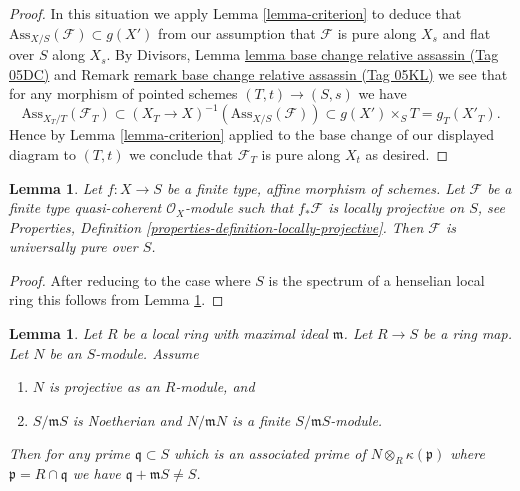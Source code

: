 \documentclass{amsart}
\theoremstyle{plain}
\newtheorem{lemma}[subsection]{Lemma}
\theoremstyle{definition}
\theoremstyle{remark}
\numberwithin{equation}{subsection}
\begin{document}
\begin{proof}
\medskip\noindent
In this situation we apply
Lemma \ref{lemma-criterion}
to deduce that $\text{Ass}_{X/S}(\mathcal{F}) \subset g(X')$
from our assumption that $\mathcal{F}$ is pure along $X_s$
and flat over $S$ along $X_s$. By
Divisors, Lemma \href{https://stacks.math.columbia.edu/tag/05DC}{lemma base change relative assassin (Tag 05DC)} and
Remark \href{https://stacks.math.columbia.edu/tag/05KL}{remark base change relative assassin (Tag 05KL)}
we see that for any morphism of pointed schemes
$(T, t) \to (S, s)$ we have
$$
\text{Ass}_{X_T/T}(\mathcal{F}_T) \subset
(X_T \to X)^{-1}(\text{Ass}_{X/S}(\mathcal{F})) \subset
g(X') \times_S T = g_T(X'_T).
$$
Hence by
Lemma \ref{lemma-criterion}
applied to the base change of our displayed diagram to $(T, t)$
we conclude that $\mathcal{F}_T$ is pure along $X_t$ as desired.
\end{proof}


\begin{lemma}
\label{lemma-affine-locally-projective-pure}
Let $f : X \to S$ be a finite type, affine morphism of schemes.
Let $\mathcal{F}$ be a finite type quasi-coherent $\mathcal{O}_X$-module
such that $f_*\mathcal{F}$ is locally projective on $S$, see
Properties, Definition \ref{properties-definition-locally-projective}.
Then $\mathcal{F}$ is universally pure over $S$.
\end{lemma}

\begin{proof}
After reducing to the case where $S$ is the spectrum of a henselian
local ring this follows from
Lemma \ref{lemma-explain-why-pure}.
\end{proof}


\begin{lemma}
\label{lemma-explain-why-pure}
Let $R$ be a local ring with maximal ideal $\mathfrak m$.
Let $R \to S$ be a ring map. Let $N$ be an $S$-module.
Assume
\begin{enumerate}
\item $N$ is projective as an $R$-module, and
\item $S/\mathfrak mS$ is Noetherian and $N/\mathfrak mN$ is a finite
$S/\mathfrak mS$-module.
\end{enumerate}
Then for any prime $\mathfrak q \subset S$ which is an associated prime of
$N \otimes_R \kappa(\mathfrak p)$ where $\mathfrak p = R \cap \mathfrak q$
we have $\mathfrak q + \mathfrak m S \not = S$.
\end{lemma}
\end{document}
